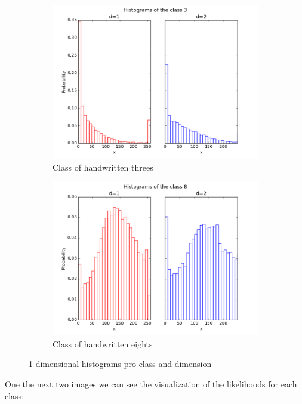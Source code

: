 \documentclass{article}
\begin{document}
\begin{figure}[ht]
        \centering
        \begin{subfigure}[b]{0.5\textwidth}
                \includegraphics[width=\textwidth]{../histograms3.png}
                \caption{Class of handwritten threes}
        \end{subfigure}%
        \begin{subfigure}[b]{0.5\textwidth}
                \includegraphics[width=\textwidth]{../histograms8.png}
                \caption{Class of handwritten eights}
        \end{subfigure}
        \caption{1 dimensional histograms pro class and dimension}
        \label{img1}
\end{figure}
\FloatBarrier
One the next two images we can see the visualization of the likelihoods for each class:
\end{document}
